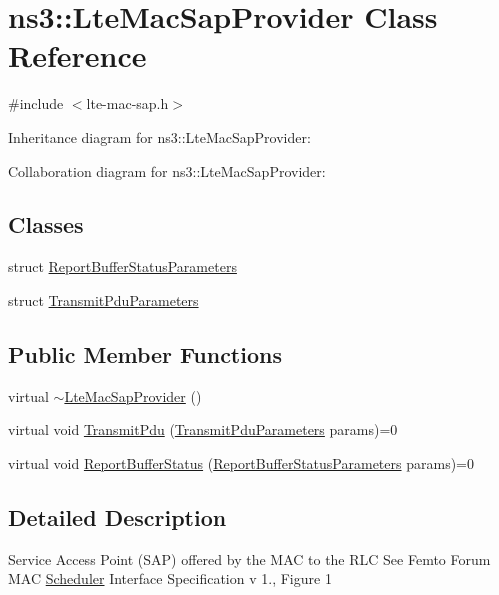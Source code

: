 \hypertarget{classns3_1_1LteMacSapProvider}{}\section{ns3\+:\+:Lte\+Mac\+Sap\+Provider Class Reference}
\label{classns3_1_1LteMacSapProvider}


{\ttfamily \#include $<$lte-\/mac-\/sap.\+h$>$}



Inheritance diagram for ns3\+:\+:Lte\+Mac\+Sap\+Provider\+:


Collaboration diagram for ns3\+:\+:Lte\+Mac\+Sap\+Provider\+:
\subsection*{Classes}
\begin{DoxyCompactItemize}
\item 
struct \hyperlink{structns3_1_1LteMacSapProvider_1_1ReportBufferStatusParameters}{Report\+Buffer\+Status\+Parameters}
\item 
struct \hyperlink{structns3_1_1LteMacSapProvider_1_1TransmitPduParameters}{Transmit\+Pdu\+Parameters}
\end{DoxyCompactItemize}
\subsection*{Public Member Functions}
\begin{DoxyCompactItemize}
\item 
virtual \hyperlink{classns3_1_1LteMacSapProvider_ab6bb3a0ef0f98c20276c985eae65d379}{$\sim$\+Lte\+Mac\+Sap\+Provider} ()
\item 
virtual void \hyperlink{classns3_1_1LteMacSapProvider_a125622cc614fa4ef620d595fbec0cf07}{Transmit\+Pdu} (\hyperlink{structns3_1_1LteMacSapProvider_1_1TransmitPduParameters}{Transmit\+Pdu\+Parameters} params)=0
\item 
virtual void \hyperlink{classns3_1_1LteMacSapProvider_a9b871a79546b8d06debd925d8863d442}{Report\+Buffer\+Status} (\hyperlink{structns3_1_1LteMacSapProvider_1_1ReportBufferStatusParameters}{Report\+Buffer\+Status\+Parameters} params)=0
\end{DoxyCompactItemize}


\subsection{Detailed Description}
Service Access Point (S\+AP) offered by the M\+AC to the R\+LC See Femto Forum M\+AC \hyperlink{classns3_1_1Scheduler}{Scheduler} Interface Specification v 1., Figure 1

